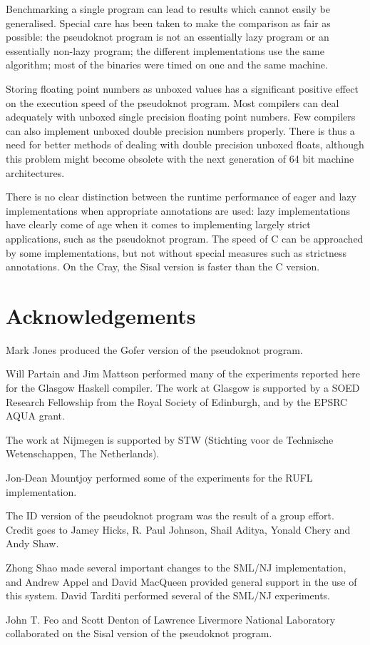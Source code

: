 Benchmarking a single program can lead to results which cannot easily
be generalised. Special care has been taken to make the comparison as
fair as possible: the pseudoknot program is not an essentially lazy
program or an essentially non-lazy program; the different
implementations use the same algorithm; most of the binaries were timed
on one and the same machine.

Storing floating point numbers as unboxed values has a significant
positive effect on the execution speed of the pseudoknot program. Most
compilers can deal adequately with unboxed single precision floating
point numbers. Few compilers can also implement unboxed double
precision numbers properly. There is thus a need for better methods of
dealing with double precision unboxed floats, although this problem
might become obsolete with the next generation of 64 bit machine
architectures.

There is no clear distinction between the runtime performance of eager
and lazy implementations when appropriate annotations are used: lazy
implementations have clearly come of age when it comes to implementing
largely strict applications, such as the pseudoknot program. The speed
of C can be approached by some implementations, but not without special
measures such as strictness annotations. On the Cray, the Sisal
version is faster than the C version.


\section*{Acknowledgements}
Mark Jones produced the Gofer version of the pseudoknot program.

Will Partain and Jim Mattson performed many of the experiments reported
here for the Glasgow Haskell compiler. The work at Glasgow is
supported by a SOED Research Fellowship from the Royal Society of
Edinburgh, and by the EPSRC AQUA grant.

The work at Nijmegen is supported by STW (Stichting voor de
Technische Wetenschappen, The Netherlands).

Jon-Dean Mountjoy performed some of the experiments for the RUFL
implementation.

The ID version of the pseudoknot program was the result of a group
effort. Credit goes to Jamey Hicks, R. Paul Johnson, Shail Aditya,
Yonald Chery and Andy Shaw.

Zhong Shao made several important changes to the SML/NJ
implementation, and Andrew Appel and David MacQueen provided general
support in the use of this system. David Tarditi performed several of
the SML/NJ experiments.

John T. Feo and Scott Denton of Lawrence Livermore National Laboratory
collaborated on the Sisal version of the pseudoknot program.





